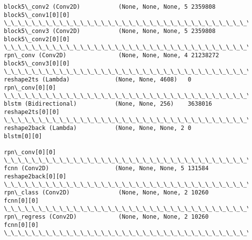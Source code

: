 \documentclass[11pt]{article}
\begin{document}
\begin{Verbatim}[commandchars=\\\{\}]
block5\_conv2 (Conv2D)           (None, None, None, 5 2359808     block5\_conv1[0][0]               
\_\_\_\_\_\_\_\_\_\_\_\_\_\_\_\_\_\_\_\_\_\_\_\_\_\_\_\_\_\_\_\_\_\_\_\_\_\_\_\_\_\_\_\_\_\_\_\_\_\_\_\_\_\_\_\_\_\_\_\_\_\_\_\_\_\_\_\_\_\_\_\_\_\_\_\_\_\_\_\_\_\_\_\_\_\_\_\_\_\_\_\_\_\_\_\_\_\_
block5\_conv3 (Conv2D)           (None, None, None, 5 2359808     block5\_conv2[0][0]               
\_\_\_\_\_\_\_\_\_\_\_\_\_\_\_\_\_\_\_\_\_\_\_\_\_\_\_\_\_\_\_\_\_\_\_\_\_\_\_\_\_\_\_\_\_\_\_\_\_\_\_\_\_\_\_\_\_\_\_\_\_\_\_\_\_\_\_\_\_\_\_\_\_\_\_\_\_\_\_\_\_\_\_\_\_\_\_\_\_\_\_\_\_\_\_\_\_\_
rpn\_conv (Conv2D)               (None, None, None, 4 21238272    block5\_conv3[0][0]               
\_\_\_\_\_\_\_\_\_\_\_\_\_\_\_\_\_\_\_\_\_\_\_\_\_\_\_\_\_\_\_\_\_\_\_\_\_\_\_\_\_\_\_\_\_\_\_\_\_\_\_\_\_\_\_\_\_\_\_\_\_\_\_\_\_\_\_\_\_\_\_\_\_\_\_\_\_\_\_\_\_\_\_\_\_\_\_\_\_\_\_\_\_\_\_\_\_\_
reshape2ts (Lambda)             (None, None, 4608)   0           rpn\_conv[0][0]                   
\_\_\_\_\_\_\_\_\_\_\_\_\_\_\_\_\_\_\_\_\_\_\_\_\_\_\_\_\_\_\_\_\_\_\_\_\_\_\_\_\_\_\_\_\_\_\_\_\_\_\_\_\_\_\_\_\_\_\_\_\_\_\_\_\_\_\_\_\_\_\_\_\_\_\_\_\_\_\_\_\_\_\_\_\_\_\_\_\_\_\_\_\_\_\_\_\_\_
blstm (Bidirectional)           (None, None, 256)    3638016     reshape2ts[0][0]                 
\_\_\_\_\_\_\_\_\_\_\_\_\_\_\_\_\_\_\_\_\_\_\_\_\_\_\_\_\_\_\_\_\_\_\_\_\_\_\_\_\_\_\_\_\_\_\_\_\_\_\_\_\_\_\_\_\_\_\_\_\_\_\_\_\_\_\_\_\_\_\_\_\_\_\_\_\_\_\_\_\_\_\_\_\_\_\_\_\_\_\_\_\_\_\_\_\_\_
reshape2back (Lambda)           (None, None, None, 2 0           blstm[0][0]                      
                                                                 rpn\_conv[0][0]                   
\_\_\_\_\_\_\_\_\_\_\_\_\_\_\_\_\_\_\_\_\_\_\_\_\_\_\_\_\_\_\_\_\_\_\_\_\_\_\_\_\_\_\_\_\_\_\_\_\_\_\_\_\_\_\_\_\_\_\_\_\_\_\_\_\_\_\_\_\_\_\_\_\_\_\_\_\_\_\_\_\_\_\_\_\_\_\_\_\_\_\_\_\_\_\_\_\_\_
fcnn (Conv2D)                   (None, None, None, 5 131584      reshape2back[0][0]               
\_\_\_\_\_\_\_\_\_\_\_\_\_\_\_\_\_\_\_\_\_\_\_\_\_\_\_\_\_\_\_\_\_\_\_\_\_\_\_\_\_\_\_\_\_\_\_\_\_\_\_\_\_\_\_\_\_\_\_\_\_\_\_\_\_\_\_\_\_\_\_\_\_\_\_\_\_\_\_\_\_\_\_\_\_\_\_\_\_\_\_\_\_\_\_\_\_\_
rpn\_class (Conv2D)              (None, None, None, 2 10260       fcnn[0][0]                       
\_\_\_\_\_\_\_\_\_\_\_\_\_\_\_\_\_\_\_\_\_\_\_\_\_\_\_\_\_\_\_\_\_\_\_\_\_\_\_\_\_\_\_\_\_\_\_\_\_\_\_\_\_\_\_\_\_\_\_\_\_\_\_\_\_\_\_\_\_\_\_\_\_\_\_\_\_\_\_\_\_\_\_\_\_\_\_\_\_\_\_\_\_\_\_\_\_\_
rpn\_regress (Conv2D)            (None, None, None, 2 10260       fcnn[0][0]                       
\_\_\_\_\_\_\_\_\_\_\_\_\_\_\_\_\_\_\_\_\_\_\_\_\_\_\_\_\_\_\_\_\_\_\_\_\_\_\_\_\_\_\_\_\_\_\_\_\_\_\_\_\_\_\_\_\_\_\_\_\_\_\_\_\_\_\_\_\_\_\_\_\_\_\_\_\_\_\_\_\_\_\_\_\_\_\_\_\_\_\_\_\_\_\_\_\_\_

\end{Verbatim}
\end{document}
